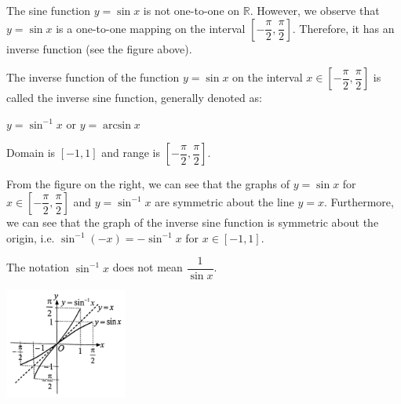\documentclass{report}
\begin{document}
        The sine function \( y=\sin x \) is not one-to-one on \( \mathbb{R} \). However, we observe that \( y=\sin x \) is a one-to-one mapping on the interval \( \left[-\dfrac{\pi}{2}, \dfrac{\pi}{2}\right] \). Therefore, it has an inverse function (see the figure above).
        
        The inverse function of the function \( y=\sin x \) on the interval \( x \in\left[-\dfrac{\pi}{2}, \dfrac{\pi}{2}\right] \) is called the inverse sine function, generally denoted as:
        
        \begin{info}
                
                \noindent $y=\sin^{-1} x \text{ or } y=\arcsin x $
                
                \noindent Domain is \( [-1,1] \) and range is \( \left[-\dfrac{\pi}{2}, \dfrac{\pi}{2}\right] \).
            \end{info}

    \begin{vwcol}[widths={0.6,0.4}, sep=0.5cm, rule=0pt]
        From the figure on the right, we can see that the graphs of \( y=\sin x \) for \( x \in\left[-\dfrac{\pi}{2}, \dfrac{\pi}{2}\right] \) and \( y=\sin^{-1} x \) are symmetric about the line \( y=x \). Furthermore, we can see that the graph of the inverse sine function is symmetric about the origin, i.e. \( \sin^{-1}(-x)=-\sin^{-1} x \) for \( x \in[-1,1] \).

        \noindent \parbox{0.6\textwidth}{\begin{warn}
            
            \noindent The notation \( \sin^{-1} x \) does not mean \( \dfrac{1}{\sin x} \).
        \end{warn}}
        
        \includegraphics[width=0.3\textwidth]{assets/9-36.jpg}
\end{vwcol}
\end{document}
